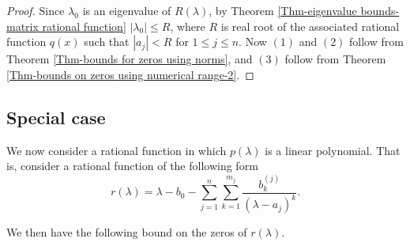 \documentclass[12pt, reqno]{amsart}
\theoremstyle{definition}
\theoremstyle{remark}
\numberwithin{equation}{section}
\begin{document}
\begin{proof}
Since $\lambda_0$ is an eigenvalue of $R(\lambda)$, by Theorem 
\ref{Thm-eigenvalue bounds-matrix rational function} $|\lambda_0| \leq R$, where 
$R$ is real root of the associated rational function $q(x)$ such that $|a_j| < R$ 
for $1 \leq j \leq n$.
Now $(1)$ and $(2)$ follow from Theorem \ref{Thm-bounds for zeros using norms}, 
and $(3)$ follow from Theorem \ref{Thm-bounds on zeros using numerical range-2}.
\end{proof}

\subsection{Special case} 

We now consider a rational function in which $p(\lambda)$ is a linear polynomial. 
That is, consider a rational function of the following form
\begin{equation}\label{Eqn- rational function}
r(\lambda) = \lambda - b_0 - \displaystyle \sum_{j=1}^{n} \sum_{k=1}^{m_j} 
\frac{b_k^{(j)}}{(\lambda-a_j)^k}.
\end{equation}

We then have the following bound on the zeros of $r(\lambda)$.
\end{document}

